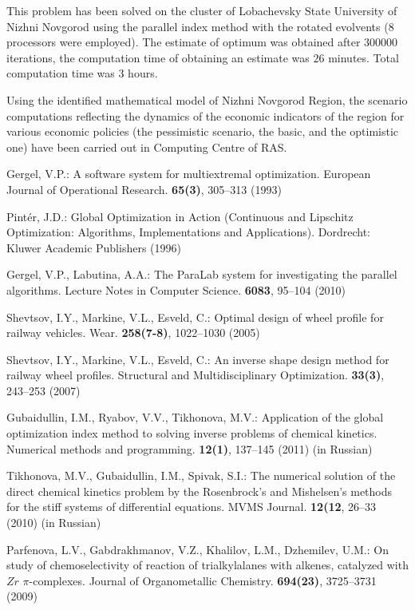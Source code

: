 This problem has been solved on the cluster of Lobachevsky State University of Nizhni Novgorod using the parallel index method with the rotated evolvents (8 processors were employed). The estimate of optimum was obtained after $300 000$ iterations, the computation time of obtaining an estimate was $26$ minutes. Total computation time was $3$ hours.

Using the identified mathematical model of Nizhni Novgorod Region, the scenario computations reflecting the dynamics of the economic indicators of the region for various economic policies (the pessimistic scenario, the basic, and the optimistic one) have been carried out in Computing Centre of RAS.

\begin{thebibliography}{99.}

Gergel, V.P.: A software system for multiextremal optimization. European Journal of Operational Research. \textbf{65(3)}, 305--313 (1993)

Pintér, J.D.: Global Optimization in Action (Continuous and Lipschitz Optimization: Algorithms, Implementations and Applications). Dordrecht: Kluwer Academic Publishers (1996)

Gergel, V.P., Labutina, A.A.: The ParaLab system for investigating the parallel algorithms. Lecture Notes in Computer Science. \textbf{6083}, 95--104 (2010)

Shevtsov, I.Y., Markine, V.L., Esveld, C.: Optimal design of wheel profile for railway vehicles. Wear. \textbf{258(7-8)}, 1022--1030 (2005)

Shevtsov, I.Y., Markine, V.L., Esveld, C.: An inverse shape design method for railway wheel profiles. Structural and Multidisciplinary Optimization. \textbf{33(3)}, 243--253 (2007)

Gubaidullin, I.M., Ryabov, V.V., Tikhonova, M.V.: Application of the global optimization index method to solving inverse problems of chemical kinetics. Numerical methods and programming. \textbf{12(1)}, 137--145 (2011) (in Russian)

Tikhonova, M.V., Gubaidullin, I.M., Spivak, S.I.: The numerical solution of the direct chemical kinetics problem by the Rosenbrock's and Mishelsen's methods for the stiff systems of differential equations. MVMS Journal. \textbf{12(12}, 26--33 (2010) (in Russian)

Parfenova, L.V., Gabdrakhmanov, V.Z., Khalilov, L.M., Dzhemilev, U.M.: On study of chemoselectivity of reaction of trialkylalanes with alkenes, catalyzed with $Zr$ $\pi$-complexes. Journal of Organometallic Chemistry. \textbf{694(23)}, 3725--3731 (2009)


\end{thebibliography}
